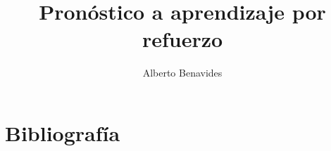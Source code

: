\documentclass{article}
\begin{document}
    \title{Pronóstico a aprendizaje por refuerzo}
    \author{Alberto Benavides}

    \maketitle

    
    
    
    
    \section{Bibliografía}
    
    
\end{document}
